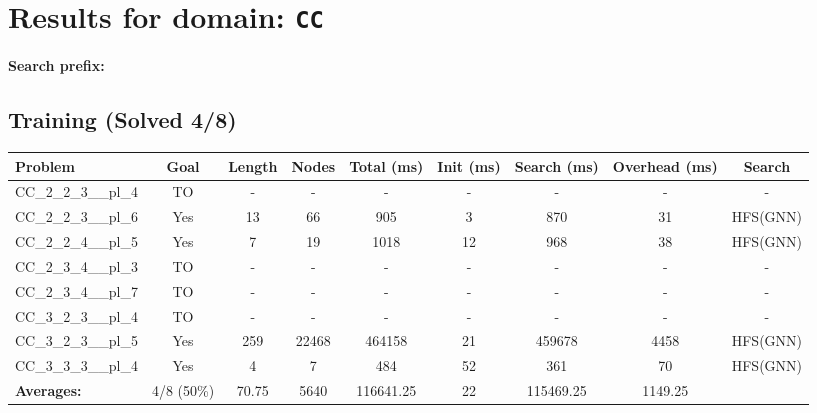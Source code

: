 \documentclass{article}
\begin{document}
\section*{Results for domain: \texttt{CC}}
\textbf{Search prefix:} 
\\[0.5cm]
\subsection*{Training (Solved 4/8)}
\begin{tabular}{lcccccccc}
\toprule
Problem & Goal & Length & Nodes & Total (ms) & Init (ms) & Search (ms) & Overhead (ms) & Search \\
\midrule
CC\_2\_2\_3\_\_pl\_4 & TO & - & - & - & - & - & - & - \\
CC\_2\_2\_3\_\_pl\_6 & Yes & 13 & 66 & 905 & 3 & 870 & 31 & HFS(GNN) \\
CC\_2\_2\_4\_\_pl\_5 & Yes & 7 & 19 & 1018 & 12 & 968 & 38 & HFS(GNN) \\
CC\_2\_3\_4\_\_pl\_3 & TO & - & - & - & - & - & - & - \\
CC\_2\_3\_4\_\_pl\_7 & TO & - & - & - & - & - & - & - \\
CC\_3\_2\_3\_\_pl\_4 & TO & - & - & - & - & - & - & - \\
CC\_3\_2\_3\_\_pl\_5 & Yes & 259 & 22468 & 464158 & 21 & 459678 & 4458 & HFS(GNN) \\
CC\_3\_3\_3\_\_pl\_4 & Yes & 4 & 7 & 484 & 52 & 361 & 70 & HFS(GNN) \\
\textbf{Averages:} & 4/8 (50\%) & 70.75 & 5640 & 116641.25 & 22 & 115469.25 & 1149.25 & \\
\bottomrule
\end{tabular}
\\[0.7cm]
\end{document}
